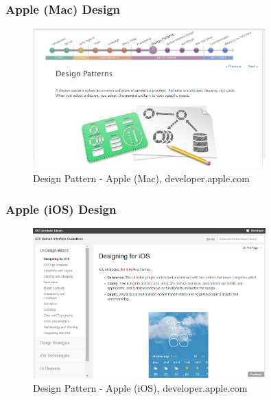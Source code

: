 \documentclass[presentation]{beamer}
\begin{document}
\begin{frame}[c]\frametitle{Apple (Mac) Design}
\begin{figure}[tb]
    \begin{center}
        \includegraphics[width=0.8\textwidth]{img/apple-design.png}
    \end{center}
    \caption{Design Pattern - Apple (Mac), developer.apple.com}
    \label{fig:apple-mac}
\end{figure}
\end{frame}

\begin{frame}[c]\frametitle{Apple (iOS) Design}
\begin{figure}[tb]
    \begin{center}
        \includegraphics[width=0.8\textwidth]{img/apple-ios-design.png}
    \end{center}
    \caption{Design Pattern - Apple (iOS), developer.apple.com}
    \label{fig:apple-ios}
\end{figure}

\end{frame}
\end{document}
